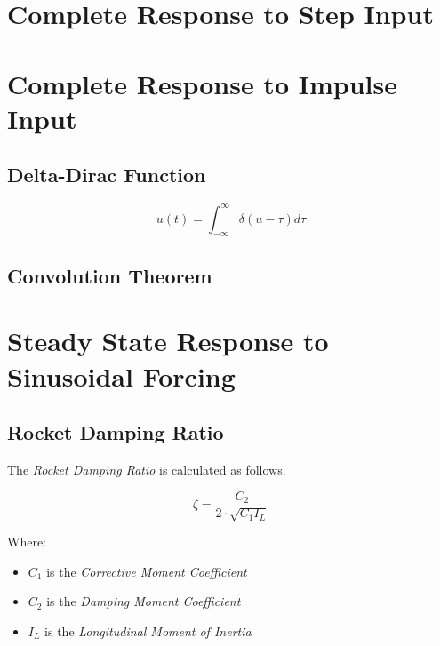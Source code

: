 \documentclass[]{book}
\providecommand{\tightlist}{%
  \setlength{\itemsep}{0pt}\setlength{\parskip}{0pt}}
\begin{document}
\section{Complete Response to Step
Input}\label{complete-response-to-step-input}

\section{Complete Response to Impulse
Input}\label{complete-response-to-impulse-input}

\subsection{Delta-Dirac Function}\label{delta-dirac-function}

\begin{equation}
\label{eq_delta_dirac}
u(t) = \int_{-\infty}^{\infty} \delta ( u - \tau ) d \tau
\end{equation}

\subsection{Convolution Theorem}\label{convolution-theorem}

\section{Steady State Response to Sinusoidal
Forcing}\label{steady-state-response-to-sinusoidal-forcing}

\subsection{Rocket Damping Ratio}\label{rocket-damping-ratio}

The \emph{Rocket Damping Ratio} is calculated as follows.

\begin{equation}
\label{eq_rocket_damping_ratio}
\zeta = \dfrac{C_2}{2 \cdot \sqrt{C_1 I_L}}
\end{equation}

Where:

\begin{itemize}
\tightlist
\item
  \(C_1\) is the \emph{Corrective Moment Coefficient}
\item
  \(C_2\) is the \emph{Damping Moment Coefficient}
\item
  \(I_L\) is the \emph{Longitudinal Moment of Inertia}
\end{itemize}
\end{document}
